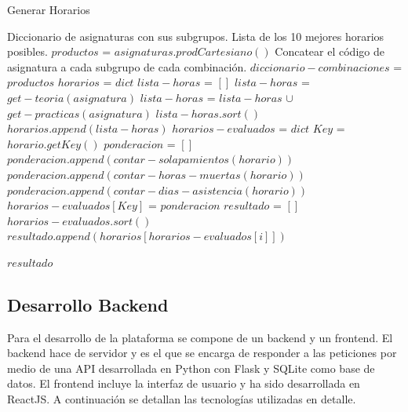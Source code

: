 \newpage

\begin{algorithm}[H]
    \caption{Generar Horarios}
    \label{alg:generar_horarios}
    \begin{algorithmic}[1]
        \Require Diccionario de asignaturas con sus subgrupos.
        \Ensure Lista de los 10 mejores horarios posibles.
            \State $productos$ = $asignaturas.prodCartesiano()$
            \State Concatear el código de asignatura a cada subgrupo de cada combinación.
            \State $diccionario-combinaciones$ = $productos$
            \State $horarios$ = $dict$
                \State $lista-horas$ = $[]$
                    \State $lista-horas$ = $get-teoria(asignatura)$
                    \State $lista-horas$ = $lista-horas$ $\cup$ $get-practicas(asignatura)$
                \EndFor
                \State $lista-horas.sort()$ 
                \State $horarios.append(lista-horas)$ 
            \EndFor
            \State $horarios-evaluados$ = $dict$
                \State $Key$ = $horario.getKey()$    
                \State $ponderacion$ = $[]$
                \State $ponderacion.append(contar-solapamientos(horario))$
                \State $ponderacion.append(contar-horas-muertas(horario))$
                \State $ponderacion.append(contar-dias-asistencia(horario))$
                \State $horarios-evaluados[Key]$ = $ponderacion$
            \EndFor
            \State $resultado$ = $[]$ 
            \State $horarios-evaluados.sort()$ 
                \State $resultado.append(horarios[horarios-evaluados[i]])$
            \EndFor

            \Return $resultado$
        \EndFunction
    \end{algorithmic}
\end{algorithm}


\subsection{Desarrollo Backend}

Para el desarrollo de la plataforma se compone de un backend y un frontend. El backend hace de servidor y es el que se encarga de responder a las peticiones por medio de una API desarrollada en Python con Flask y SQLite como base de datos. El frontend incluye la interfaz de usuario y ha sido desarrollada en ReactJS. A continuación se detallan las tecnologías utilizadas en detalle.\newline

